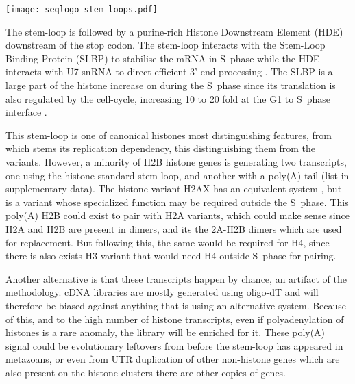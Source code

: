     \begin{figure*}
      \centering
      \texttt{[image: seqlogo\_stem\_loops.pdf]}
      \label{fig:stem-loop-seqlogo}
    \end{figure*}

    The stem-loop is followed by a purine-rich Histone Downstream Element (HDE)
    downstream of the stop codon. The stem-loop interacts with the Stem-Loop
    Binding Protein (SLBP) to stabilise the mRNA in S~phase \citep{SLBP-regulation}
    while the HDE interacts with U7 snRNA to direct efficient 3' end processing
    \citep{HDE-sequence}. The SLBP is a large part of the histone increase on
    during the S~phase since its translation is also regulated
    by the cell-cycle, increasing 10 to 20 fold at the G1 to S~phase
    interface \citep{SLBP-regulation}.

    This stem-loop is one of canonical histones most distinguishing features, from which
    stems its replication dependency, this distinguishing them from the variants.
    However, a minority of H2B histone
    genes is generating two transcripts, one using the histone standard
    stem-loop, and another with a poly(A) tail (list in supplementary data).
    The histone variant H2AX has an equivalent system \citep{HTwoAX-transcripts},
    but is a variant whose
    specialized function may be required outside the S~phase. This poly(A)
    H2B could exist to pair with H2A variants, which could make sense since
    H2A and H2B are present in dimers, and its the 2A-H2B dimers which are
    used for replacement. But following this, the same would be required
    for H4, since there is also exists H3 variant that would need H4 outside
    S~phase for pairing.


    Another alternative is that these transcripts happen by chance, an artifact
    of the methodology. cDNA libraries are mostly generated using oligo-dT
    and will therefore be biased against anything that is using an alternative
    system. Because of this, and to the high number of histone transcripts,
    even if polyadenylation of histones is a rare anomaly, the library will
    be enriched for it.
    These poly(A) signal could be evolutionary leftovers from before the
    stem-loop has appeared in metazoans, or even from UTR duplication of
    other non-histone genes which are also present on the histone clusters
    there are other copies of genes.



